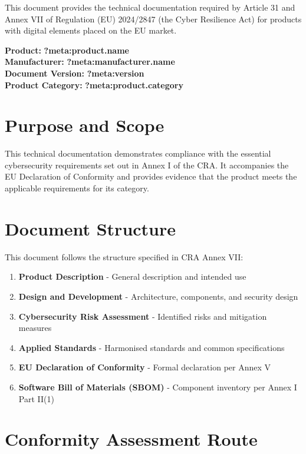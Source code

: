 \documentclass[
  11 pt,
  a4paper,
  table]{report}
\providecommand{\tightlist}{%
  \setlength{\itemsep}{0pt}\setlength{\parskip}{0pt}}\usepackage{longtable,booktabs,array}
\begin{document}

This document provides the technical documentation required by Article
31 and Annex VII of Regulation (EU) 2024/2847 (the Cyber Resilience Act)
for products with digital elements placed on the EU market.

\textbf{Product:} \textbf{?meta:product.name}\\
\textbf{Manufacturer:} \textbf{?meta:manufacturer.name}\\
\textbf{Document Version:} \textbf{?meta:version}\\
\textbf{Product Category:} \textbf{?meta:product.category}

\section{Purpose and Scope}\label{purpose-and-scope}

This technical documentation demonstrates compliance with the essential
cybersecurity requirements set out in Annex I of the CRA. It accompanies
the EU Declaration of Conformity and provides evidence that the product
meets the applicable requirements for its category.

\section{Document Structure}\label{document-structure}

This document follows the structure specified in CRA Annex VII:

\begin{enumerate}
\def\labelenumi{\arabic{enumi}.}
\tightlist
\item
  \textbf{Product Description} - General description and intended use
\item
  \textbf{Design and Development} - Architecture, components, and
  security design
\item
  \textbf{Cybersecurity Risk Assessment} - Identified risks and
  mitigation measures
\item
  \textbf{Applied Standards} - Harmonised standards and common
  specifications
\item
  \textbf{EU Declaration of Conformity} - Formal declaration per Annex V
\item
  \textbf{Software Bill of Materials (SBOM)} - Component inventory per
  Annex I Part II(1)
\end{enumerate}

\section{Conformity Assessment Route}\label{conformity-assessment-route}
\end{document}
